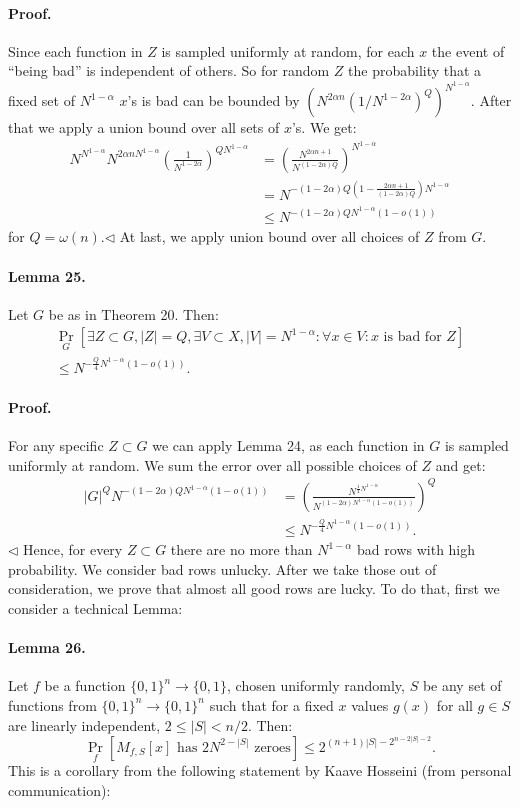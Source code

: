 \paragraph{Proof.} Since each function in $Z$ is sampled uniformly at random, for each $x$ the event of ``being bad'' is independent of others. So for random $Z$ the probability that a fixed set of $N^{1-\alpha}$ $x$'s is bad can be bounded by $(N^{2\alpha n}(1/N^{1-2\alpha})^Q)^{N^{1-\alpha}}$. After that we apply a union bound over all sets of $x$'s.
We get:
\begin{align*}
N^{N^{1-\alpha}}N^{2\alpha nN^{1-\alpha}}\left(\frac1{N^{1-2\alpha}}\right)^{QN^{1-\alpha}}
&=\left(\frac{N^{2\alpha n+1}}{N^{(1-2\alpha)Q}}\right)^{N^{1-\alpha}}\\
&=N^{-(1-2\alpha)Q(1-\frac{2\alpha n+1}{(1-2\alpha)Q})N^{1-\alpha}}\\
&\leq N^{-(1-2\alpha)QN^{1-\alpha}(1-o(1))}
\end{align*}
for $Q=\omega(n)$.\hfill$\triangleleft$
At last, we apply union bound over all choices of $Z$ from $G$.
\paragraph{Lemma 25.} Let $G$ be as in Theorem 20. Then:
\begin{multline*}
\Pr_G[\exists Z\subset G,|Z|=Q,\exists V\subset X,|V|=N^{1-\alpha}:\forall x\in V:x\text{ is bad for }Z]\\
\leq N^{-\frac Q4N^{1-\alpha}(1-o(1))}.
\end{multline*}
\paragraph{Proof.} For any specific $Z\subset G$ we can apply Lemma 24, as each function in $G$ is sampled uniformly at random. We sum the error over all possible choices of $Z$ and get:
\begin{align*}
|G|^QN^{-(1-2\alpha)QN^{1-\alpha}(1-o(1))}
&=\left(\frac{N^{\frac14N^{1-\alpha}}}{N^{(1-2\alpha)N^{1-\alpha}(1-o(1))}}\right)^Q\\
&\leq N^{-\frac Q4N^{1-\alpha}(1-o(1))}.
\end{align*}\hfill$\triangleleft$
Hence, for every $Z\subset G$ there are no more than $N^{1-\alpha}$ bad rows with high probability.
We consider bad rows unlucky. After we take those out of consideration, we prove that almost all good rows are lucky.
To do that, first we consider a technical Lemma:
\paragraph{Lemma 26.} Let $f$ be a function $\{0,1\}^n\to\{0,1\}$, chosen uniformly randomly, $S$ be any set of functions from $\{0,1\}^n\to\{0,1\}^n$ such that for a fixed $x$ values $g(x)$ for all $g\in S$ are linearly independent, $2\leq|S|<n/2$. Then:
\[\Pr_f[M_{f,S}[x]\text{ has }2N^{2-|S|}\text{ zeroes}]\leq2^{(n+1)|S|-2^{n-2|S|-2}}.\]
This is a corollary from the following statement by Kaave Hosseini (from personal communication):
